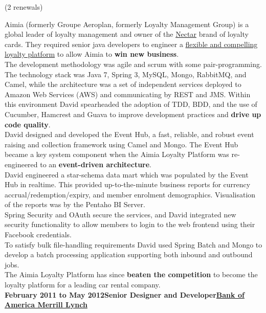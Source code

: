 \documentclass[a4paper,12pt]{article}
\newcommand{\clientwork}[3]{\textbf{#1\hfill#3\hfill#2}\nopagebreak}
\newcommand{\renewals}[2]{(#2)\nopagebreak}
\begin{document}
\renewals{18 months}{2 renewals}

Aimia (formerly Groupe Aeroplan, formerly Loyalty Management Group) is a global leader of loyalty management and owner of the \href{http://www.nectar.com/}{Nectar} brand of loyalty cards. They required senior java developers to engineer a \href{http://www.aimia.com/English/Services/Aimia-Systems/Loyalty-Platform}{flexible and compelling loyalty platform} to allow Aimia to \textbf{win new business}.\\

The development methodology was agile and scrum with some pair-programming.  The technology stack was Java 7, Spring 3, MySQL, Mongo, RabbitMQ, and Camel, while the architecture was a set of independent services deployed to Amazon Web Services (AWS) and communicating by REST and JMS. Within this environment David spearheaded the adoption of TDD, BDD, and the use of Cucumber, Hamcrest and Guava to improve development practices and \textbf{drive up code quality}.\\

David designed and developed the Event Hub, a fast, reliable, and robust event raising and collection framework using Camel and Mongo. The Event Hub became a key system component when the Aimia Loyalty Platform was re-engineered to an \textbf{event-driven architecture}.\\

David engineered a star-schema data mart which was populated by the Event Hub in realtime. This provided up-to-the-minute business reports for currency accrual/redemption/expiry, and member enrolment demographics. Visualisation of the reports was by the Pentaho BI Server.\\

Spring Security and OAuth secure the services, and David integrated new security functionality to allow members to login to the web frontend using their Facebook credentials.\\

To satisfy bulk file-handling requirements David used Spring Batch and Mongo to develop a batch processing application supporting both inbound and outbound jobs.\\

The Aimia Loyalty Platform has since \textbf{beaten the competition} to become the loyalty platform for a leading car rental company.\\

\clientwork{February 2011 to May 2012}{\href{http://corp.bankofamerica.com/}{Bank of America Merrill Lynch}}{Senior Designer and Developer}
\end{document}

